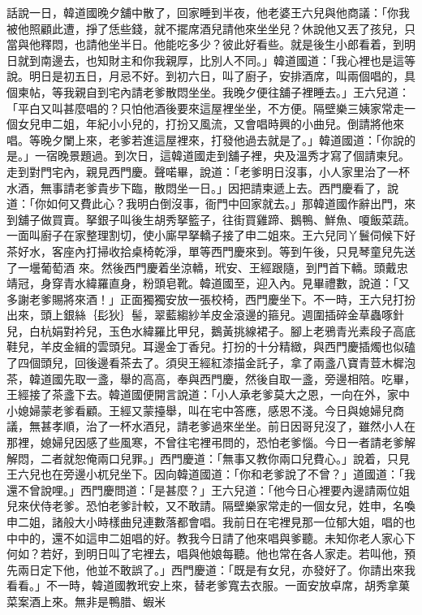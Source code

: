 \begin{showcontents}{}
話說一日，韓道國晚夕舖中散了，回家睡到半夜，他老婆王六兒與他商議：「你我被他照顧此遭，掙了恁些錢，就不擺席酒兒請他來坐坐兒？休說他又丟了孩兒，只當與他釋悶，也請他坐半日。他能吃多少？彼此好看些。就是後生小郎看着，到明日就到南邊去，也知財主和你我親厚，比別人不同。」韓道國道：「我心裡也是這等說。明日是初五日，月忌不好。到初六日，叫了廚子，安排酒席，叫兩個唱的，具個柬帖，等我親自到宅內請老爹散悶坐坐。我晚夕便往舖子裡睡去。」王六兒道：「平白又叫甚麼唱的？只怕他酒後要來這屋裡坐坐，不方便。隔壁樂三姨家常走一個女兒申二姐，年紀小小兒的，打扮又風流，又會唱時興的小曲兒。倒請將他來唱。等晚夕闌上來，老爹若進這屋裡來，打發他過去就是了。」韓道國道：「你說的是。」一宿晚景題過。到次日，這韓道國走到舖子裡，央及溫秀才寫了個請柬兒。走到對門宅內，親見西門慶。聲喏畢，說道：「老爹明日沒事，小人家里治了一杯水酒，無事請老爹貴步下臨，散悶坐一日。」因把請柬遞上去。西門慶看了，說道：「你如何又費此心？我明白倒沒事，衙門中回家就去。」那韓道國作辭出門，來到舖子做買賣。拏銀子叫後生胡秀拏籃子，往街買雞蹄、鵝鴨、鮮魚、嗄飯菜蔬。一面叫廚子在家整理割切，使小廝早拏轎子接了申二姐來。王六兒同丫鬟伺候下好茶好水，客座內打掃收拾桌椅乾淨，單等西門慶來到。等到午後，只見琴童兒先送了一壜葡萄酒 來。然後西門慶着坐涼轎，玳安、王經跟隨，到門首下轎。頭戴忠靖冠，身穿青水緯羅直身，粉頭皂靴。韓道國至，迎入內。見畢禮數，說道：「又多謝老爹賜將來酒！」正面獨獨安放一張校椅，西門慶坐下。不一時，王六兒打扮出來，頭上銀絲｛髟狄｝髻，翠藍縐紗羊皮金滾邊的箍兒。週圍插碎金草蟲啄針兒，白杭娟對衿兒，玉色水緯羅比甲兒，鵝黃挑線裙子。腳上老鴉青光素段子高底鞋兒，羊皮金緝的雲頭兒。耳邊金丁香兒。打扮的十分精緻，與西門慶插燭也似磕了四個頭兒，回後邊看茶去了。須臾王經紅漆描金託子，拿了兩盞八寶青荳木樨泡茶，韓道國先取一盞，舉的高高，奉與西門慶，然後自取一盞，旁邊相陪。吃畢，王經接了茶盞下去。韓道國便開言說道：「小人承老爹莫大之恩，一向在外，家中小媳婦蒙老爹看顧。王經又蒙擡舉，叫在宅中答應，感恩不淺。今日與媳婦兒商議，無甚孝順，治了一杯水酒兒，請老爹過來坐坐。前日因哥兒沒了，雖然小人在那裡，媳婦兒因感了些風寒，不曾往宅裡弔問的，恐怕老爹惱。今日一者請老爹解解悶，二者就恕俺兩口兒罪。」西門慶道：「無事又教你兩口兒費心。」說着，只見王六兒也在旁邊小杌兒坐下。因向韓道國道：「你和老爹說了不曾？」道國道：「我還不曾說哩。」西門慶問道：「是甚麼？」王六兒道：「他今日心裡要內邊請兩位姐兒來伏侍老爹。恐怕老爹計較，又不敢請。隔壁樂家常走的一個女兒，姓申，名喚申二姐，諸般大小時樣曲兒連數落都會唱。我前日在宅裡見那一位郁大姐，唱的也中中的，還不如這申二姐唱的好。教我今日請了他來唱與爹聽。未知你老人家心下何如？若好，到明日叫了宅裡去，唱與他娘每聽。他也常在各人家走。若叫他，預先兩日定下他，他並不敢誤了。」西門慶道：「既是有女兒，亦發好了。你請出來我看看。」不一時，韓道國教玳安上來，替老爹寬去衣服。一面安放卓席，胡秀拿菓菜案酒上來。無非是鴨腊、蝦米 
\end{showcontents}
